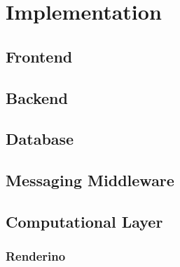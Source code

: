 \documentclass{Configuration_Files/PoliMi3i_thesis}
\begin{document}
	\chapter{Implementation}
	\label{ch:implementation}

		\section{Frontend}
		\label{se:frontend}

		\section{Backend}
		\label{se:backend}

		\section{Database}
		\label{se:database}

		\section{Messaging Middleware}
		\label{se:mom}

		\section{Computational Layer}
		\label{se:complayer}
			
			\subsection{Renderino}
			\label{sse:renderino}

\end{document}
